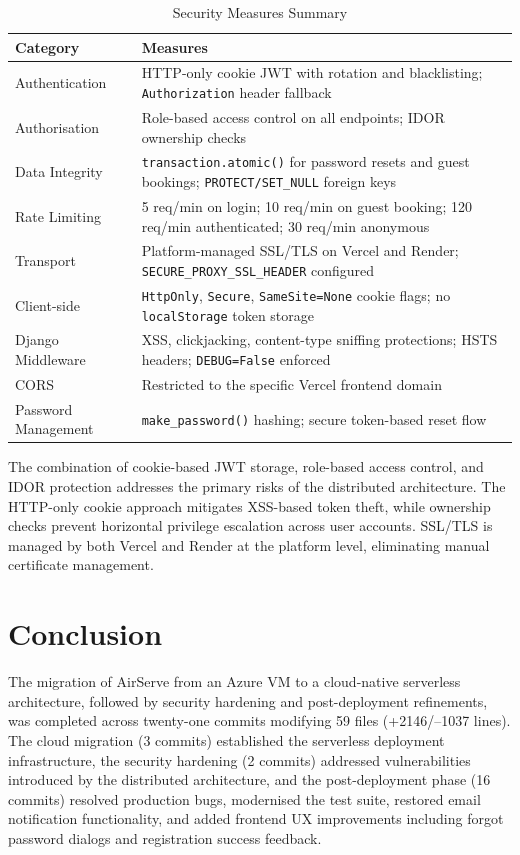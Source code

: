 \documentclass[conference]{IEEEtran}
\begin{document}
\begin{table}[H]
\centering
\caption{Security Measures Summary}
\label{tab:security-summary}
\begin{tabular}{@{}p{2.5cm}p{5cm}@{}}
\toprule
\textbf{Category} & \textbf{Measures} \\
\midrule
Authentication & HTTP-only cookie JWT with rotation and blacklisting; \texttt{Authorization} header fallback \\
Authorisation & Role-based access control on all endpoints; IDOR ownership checks \\
Data Integrity & \texttt{transaction.atomic()} for password resets and guest bookings; \texttt{PROTECT/SET\_NULL} foreign keys \\
Rate Limiting & 5 req/min on login; 10 req/min on guest booking; 120 req/min authenticated; 30 req/min anonymous \\
Transport & Platform-managed SSL/TLS on Vercel and Render; \texttt{SECURE\_PROXY\_SSL\_HEADER} configured \\
Client-side & \texttt{HttpOnly}, \texttt{Secure}, \texttt{SameSite=None} cookie flags; no \texttt{localStorage} token storage \\
Django Middleware & XSS, clickjacking, content-type sniffing protections; HSTS headers; \texttt{DEBUG=False} enforced \\
CORS & Restricted to the specific Vercel frontend domain \\
Password Management & \texttt{make\_password()} hashing; secure token-based reset flow \\
\bottomrule
\end{tabular}
\end{table}

The combination of cookie-based JWT storage, role-based access control, and IDOR protection addresses the primary risks of the distributed architecture. The HTTP-only cookie approach mitigates XSS-based token theft, while ownership checks prevent horizontal privilege escalation across user accounts. SSL/TLS is managed by both Vercel and Render at the platform level, eliminating manual certificate management.

\section{Conclusion}

The migration of AirServe from an Azure VM to a cloud-native serverless architecture, followed by security hardening and post-deployment refinements, was completed across twenty-one commits modifying 59 files (+2146/--1037 lines). The cloud migration (3 commits) established the serverless deployment infrastructure, the security hardening (2 commits) addressed vulnerabilities introduced by the distributed architecture, and the post-deployment phase (16 commits) resolved production bugs, modernised the test suite, restored email notification functionality, and added frontend UX improvements including forgot password dialogs and registration success feedback.
\end{document}
